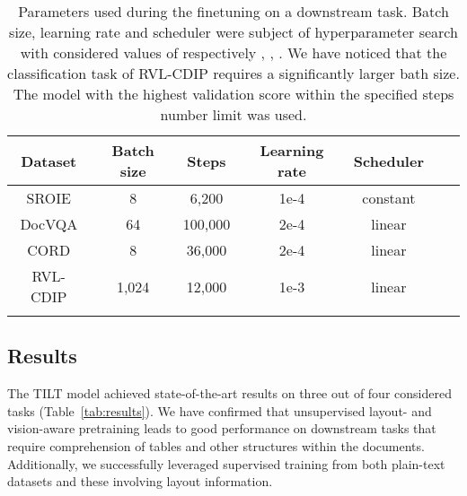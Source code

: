 \documentclass[runningheads]{llncs}
\begin{document}
\begin{table}
    \caption{Parameters used during the finetuning on a downstream task. Batch size, learning rate and scheduler were subject of hyperparameter search with considered values of respectively , , . We have noticed that the classification task of RVL-CDIP requires a significantly larger bath size. The model with the highest validation score within the specified steps number limit was used. \label{tab:finetune-params}}
    \setlength{\tabcolsep}{5pt}
    \centering
    \begin{tabular}{*7c}
        \toprule
        Dataset & Batch size & Steps & Learning rate & Scheduler \\
        \midrule
        SROIE & 8 & 6,200 & 1e-4 & constant  \\
DocVQA & 64 & 100,000 & 2e-4 & linear  \\
        CORD & 8 & 36,000 & 2e-4 & linear  \\
        RVL-CDIP & 1,024 & 12,000 & 1e-3 & linear  \\
        \bottomrule  \\
    \end{tabular} 
\end{table}

\subsection{Results}

The TILT model achieved state-of-the-art results on three out of four considered tasks (Table~\ref{tab:results}). We have confirmed that unsupervised layout- and vision-aware pretraining leads to good performance on downstream tasks that require comprehension of tables and other structures within the documents. Additionally, we successfully leveraged supervised training from both plain-text datasets and these involving layout information.
\end{document}
